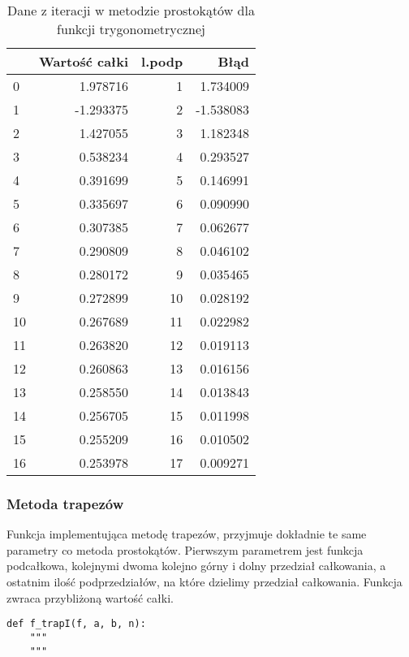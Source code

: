 \documentclass[12pt,twoside]{article}
\begin{document}
\begin{table}[H]
\centering 
\caption{Dane z iteracji w metodzie prostokątów dla funkcji trygonometrycznej}
\label{tabela1.2}
\begin{tabular}{lrrr}
\toprule
{} &  Wartość całki &  l.podp &      Błąd \\
\midrule
0  &       1.978716 &       1 &  1.734009 \\
1  &      -1.293375 &       2 & -1.538083 \\
2  &       1.427055 &       3 &  1.182348 \\
3  &       0.538234 &       4 &  0.293527 \\
4  &       0.391699 &       5 &  0.146991 \\
5  &       0.335697 &       6 &  0.090990 \\
6  &       0.307385 &       7 &  0.062677 \\
7  &       0.290809 &       8 &  0.046102 \\
8  &       0.280172 &       9 &  0.035465 \\
9  &       0.272899 &      10 &  0.028192 \\
10 &       0.267689 &      11 &  0.022982 \\
11 &       0.263820 &      12 &  0.019113 \\
12 &       0.260863 &      13 &  0.016156 \\
13 &       0.258550 &      14 &  0.013843 \\
14 &       0.256705 &      15 &  0.011998 \\
15 &       0.255209 &      16 &  0.010502 \\
16 &       0.253978 &      17 &  0.009271 \\
\bottomrule
\end{tabular}
\end{table}

\subsubsection{Metoda trapezów}

Funkcja implementująca metodę trapezów, przyjmuje dokładnie te same parametry co metoda prostokątów. Pierwszym parametrem jest funkcja podcałkowa, kolejnymi dwoma kolejno górny i dolny przedział całkowania, a ostatnim  ilość podprzedziałów, na które dzielimy przedział całkowania. Funkcja zwraca przybliżoną wartość całki.

\begin{lstlisting}[caption={Kod w języku python implementujący metodę trapezów}]
def f_trapI(f, a, b, n):
    """
    """
\end{lstlisting}
\label{Listing 7}
\end{document}
